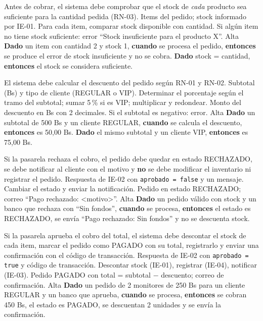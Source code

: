 \documentclass[11pt,a4paper,oneside]{report}
\newcommand{\code}[1]{\texttt{#1}}
\begin{document}
{Antes de cobrar, el sistema debe comprobar que el stock de \emph{cada} producto sea suficiente para la cantidad pedida (RN-03).}
{Items del pedido; stock informado por IE-01.}
{Para cada item, comparar stock disponible con cantidad.}
{Si algún item no tiene stock suficiente: error ``Stock insuficiente para el producto X''.}
{Alta}
{\textbf{Dado} un item con cantidad 2 y stock 1, \textbf{cuando} se procesa el pedido, \textbf{entonces} se produce el error de stock insuficiente y no se cobra. \textbf{Dado} stock = cantidad, \textbf{entonces} el stock se considera suficiente.}

{El sistema debe calcular el descuento del pedido según RN-01 y RN-02.}
{Subtotal (Bs) y tipo de cliente (REGULAR o VIP).}
{Determinar el porcentaje según el tramo del subtotal; sumar 5\,\% si es VIP; multiplicar y redondear.}
{Monto del descuento en Bs con 2 decimales. Si el subtotal es negativo: error.}
{Alta}
{\textbf{Dado} un subtotal de 500 Bs y un cliente REGULAR, \textbf{cuando} se calcula el descuento, \textbf{entonces} es 50,00 Bs. \textbf{Dado} el mismo subtotal y un cliente VIP, \textbf{entonces} es 75,00 Bs.}

{Si la pasarela rechaza el cobro, el pedido debe quedar en estado RECHAZADO, se debe notificar al cliente con el motivo y \textbf{no} se debe modificar el inventario ni registrar el pedido.}
{Respuesta de IE-02 con \code{aprobado = false} y un mensaje.}
{Cambiar el estado y enviar la notificación.}
{Pedido en estado RECHAZADO; correo ``Pago rechazado: <motivo>''.}
{Alta}
{\textbf{Dado} un pedido válido con stock y un banco que rechaza con ``Sin fondos'', \textbf{cuando} se procesa, \textbf{entonces} el estado es RECHAZADO, se envía ``Pago rechazado: Sin fondos'' y no se descuenta stock.}

{Si la pasarela aprueba el cobro del total, el sistema debe descontar el stock de cada item, marcar el pedido como PAGADO con su total, registrarlo y enviar una confirmación con el código de transacción.}
{Respuesta de IE-02 con \code{aprobado = true} y código de transacción.}
{Descontar stock (IE-01), registrar (IE-04), notificar (IE-03).}
{Pedido PAGADO con total = subtotal $-$ descuento; correo de confirmación.}
{Alta}
{\textbf{Dado} un pedido de 2 monitores de 250 Bs para un cliente REGULAR y un banco que aprueba, \textbf{cuando} se procesa, \textbf{entonces} se cobran 450 Bs, el estado es PAGADO, se descuentan 2 unidades y se envía la confirmación.}
\end{document}
